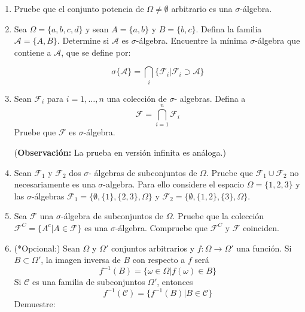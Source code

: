 \documentclass[10pt,a4paper]{article}
\begin{document}
\begin{enumerate}
	
	
	
	\item Pruebe que el conjunto potencia de $\Omega \not= \emptyset$ arbitrario es una $\sigma$-álgebra.
	
	\item Sea $\Omega = \{a,b,c,d\}$ y sean $A=\{a,b\}$ y $B = \{b,c\}$. Defina la familia $\mathcal{A} = \{A,B\}$. Determine si $\mathcal{A}$ es $\sigma$-álgebra. Encuentre la mínima $\sigma$-álgebra que contiene a $\mathcal{A}$, que se define por:
	
	\[
	\sigma\{\mathcal{A}\} = \bigcap_i \{ \mathcal{F}_i | \mathcal{F}_i \supset \mathcal{A} \}
	\]
	
	\item Sean $\mathcal{F}_i$ para $i=1,\dots,n$ una colección de $\sigma$- algebras. Defina a 
	\[
	\mathcal{F} = \bigcap_{i=1}^{n} \mathcal{F}_i
	\]
	Pruebe que $\mathcal{F}$ es $\sigma$-álgebra.
	
	(\textbf{Observación:} La prueba en versión infinita es análoga.)
	
	\item Sean $\mathcal{F}_1$ y $\mathcal{F}_2$ dos $\sigma$- álgebras de subconjuntos de $\Omega$. Pruebe que $\mathcal{F}_1 \cup \mathcal{F}_2$ no necesariamente es una $\sigma$-algebra. Para ello considere el espacio $\Omega = \{1,2,3\}$ y las $\sigma$-álgebras $\mathcal{F}_1 = \{ \emptyset, \{1\}, \{2,3\}, \Omega\}$ y $\mathcal{F}_2 = \{ \emptyset, \{1,2\}, \{3\}, \Omega\}$.
	
	
	\item Sea $\mathcal{F}$ una $\sigma$-álgebra de subconjuntos de $\Omega$. Pruebe que la colección $\mathcal{F}^C = \{ A^c | A \in \mathcal{F}\}$ es una $\sigma$-álgebra. Compruebe que $\mathcal{F}^C$ y $\mathcal{F}$ coinciden.
	
	
	
	\item (*Opcional:) Sean $\Omega$ y $\Omega'$ conjuntos arbitrarios y $f:\Omega \rightarrow \Omega'$ una función. Si $B \subset \Omega'$, la imagen inversa de $B$ con respecto a $f$ será 
	\[
	f^{-1}(B) = \{ \omega \in \Omega | f(\omega ) \in B\}
	\]
	Si $\mathcal{C}$ es una familia de subconjuntos $\Omega'$, entonces
	\[
	f^{-1} (\mathcal{C}) = \{ f^{-1} (B) | B \in \mathcal{C}\}
	\]
	Demuestre:
	

\end{enumerate}
\end{document}
